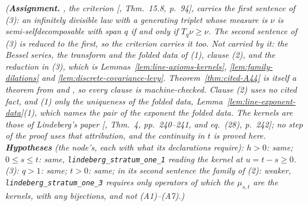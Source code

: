 \begin{proposition}
\begin{enumerate}
\end{enumerate}
\statusA\quad{}\quad\emph{(\textbf{Assignment.} , the criterion
[, Thm.~15.8, p.~94], carries the first sentence of (3): an infinitely
divisible law with a generating triplet whose \Levy{} measure is $\nu$ is semi-selfdecomposable
with span $q$ if and only if $T_q\nu \ge \nu$. The second sentence of (3) is reduced to the first,
so the criterion carries it too. Not carried by it: the Bessel series, the transform and the folded
data of (1), clause (2), and the reduction in (3), which is
Lemmas~\ref{lem:line-axioms-kernels}, \ref{lem:family-dilations} and
\ref{lem:discrete-covariance-levy}. Theorem~\ref{thm:cited-A44} is itself a theorem from
 and , so every clause is machine-checked. Clause (2) uses no cited fact,
and (1) only the uniqueness of the folded data, Lemma~\ref{lem:line-exponent-data}(1), which names
the pair of the exponent the folded data.
The kernels are those of Lindeberg's paper [, Thm.~4, pp.~240--241,
and eq.~(28), p.~242]; no step
of the proof uses that attribution, and the continuity in $t$ is proved here.
\textbf{Hypotheses} (the node's, each with what its declarations require): $h > 0$: same; $0 \le s \le t$:
same, \texttt{lindeberg\_stratum\_one\_1} reading the kernel at $u = t - s \ge 0$. (3): $q > 1$:
same; $t > 0$: same; in its second sentence the family of (2): weaker,
\texttt{lindeberg\_stratum\_one\_3} requires only operators of which the $\mu_{s,t}$ are the kernels,
with any bijections, and not (A1)--(A7).)}
\end{proposition}

